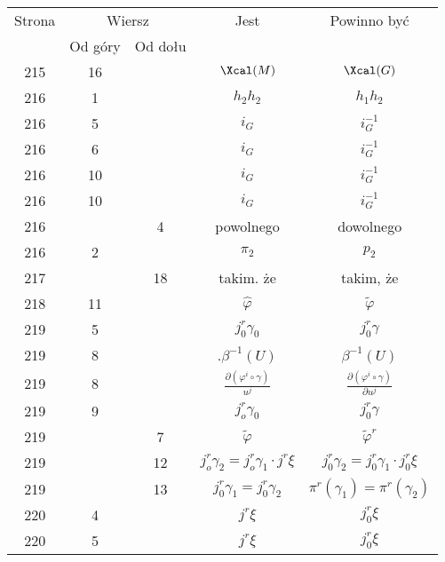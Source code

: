 \documentclass[a4paper,11pt]{article}
\numberwithin{equation}{section}
\begin{document}
\begin{center}
  \begin{tabular}{|c|c|c|c|c|}
    \hline
    Strona & \multicolumn{2}{c|}{Wiersz} & Jest
                              & Powinno być \\ \cline{2-3}
    & Od góry & Od dołu & & \\
    \hline
    215 & 16 & & $\Xcal( M )$ & $\Xcal( G )$ \\
    216 & \hphantom{0}1 & & $h_{ 2 } h_{ 2 }$ & $h_{ 1 } h_{ 2 }$ \\
    216 & \hphantom{0}5 & & $i_{ G }$ & $i^{ -1 }_{ G }$ \\
    216 & \hphantom{0}6 & & $i_{ G }$ & $i^{ -1 }_{ G }$ \\
    216 & 10 & & $i_{ G }$ & $i^{ -1 }_{ G }$ \\
    216 & 10 & & $i_{ G }$ & $i^{ -1 }_{ G }$ \\
    216 & & \hphantom{0}4 & powolnego & dowolnego \\
    216 & \hphantom{0}2 & & $\pi_{ 2 }$ & $p_{ 2 }$ \\
    217 & & 18 & takim. że & takim, że \\
    218 & 11 & & $\widehat{ \varphi }$ & $\widetilde{ \varphi }$ \\
    219 & \hphantom{0}5 & & $j^{ r }_{ 0 } \gamma_{ 0 }$ & $j^{ r }_{ 0 } \gamma$ \\
    219 & \hphantom{0}8 & & $.\beta^{ -1 }( U )$ & $\beta^{ -1 }( U )$ \\
    219 & \hphantom{0}8 & & $\frac{ \partial ( \varphi^{ i } \circ \gamma ) }{ u^{ j } }$
           & $\frac{ \partial ( \varphi^{ i } \circ \gamma ) }{ \partial u^{ j } }$ \\
    219 & \hphantom{0}9 & & $j_{ o }^{ r } \gamma_{ 0 }$ & $j_{ 0 }^{ r } \gamma$ \\
    219 & & \hphantom{0}7 & $\widetilde{ \varphi }$ & $\widetilde{ \varphi }^{ r }$ \\
    219 & & 12 & $j^{ r }_{ o } \gamma_{ 2 }
                 = j^{ r }_{ o } \gamma_{ 1 } \cdot j^{ r } \xi$
           & $j^{ r }_{ 0 } \gamma_{ 2 }
             = j^{ r }_{ 0 } \gamma_{ 1 } \cdot j^{ r }_{ 0 } \xi$ \\
    219 & & 13 & $j_{ 0 }^{ r } \gamma_{ 1 } = j_{ 0 }^{ r } \gamma_{ 2 }$
           & $\pi^{ r } ( \gamma_{ 1 } ) = \pi^{ r }( \gamma_{ 2 } )$ \\
    220 & \hphantom{0}4 & & $j^{ r } \xi$ & $j^{ r }_{ 0 } \xi$ \\
    220 & \hphantom{0}5 & & $j^{ r } \xi$ & $j^{ r }_{ 0 } \xi$ \\

\end{tabular}
\end{center}
\end{document}
